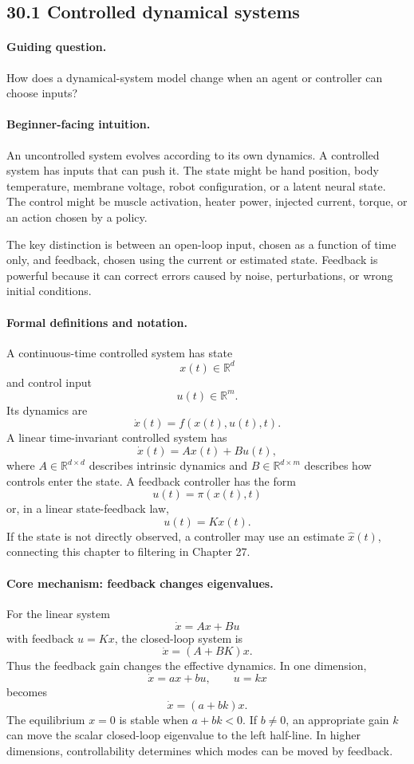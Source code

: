 \subsection{30.1 Controlled dynamical systems}

\paragraph{Guiding question.}
How does a dynamical-system model change when an agent or controller can choose inputs?

\paragraph{Beginner-facing intuition.}
An uncontrolled system evolves according to its own dynamics. A controlled system has inputs that can push it. The state might be hand position, body temperature, membrane voltage, robot configuration, or a latent neural state. The control might be muscle activation, heater power, injected current, torque, or an action chosen by a policy.

The key distinction is between an open-loop input, chosen as a function of time only, and feedback, chosen using the current or estimated state. Feedback is powerful because it can correct errors caused by noise, perturbations, or wrong initial conditions.

\paragraph{Formal definitions and notation.}
A continuous-time controlled system has state
\[
x(t)\in\mathbb R^d
\]
and control input
\[
u(t)\in\mathbb R^m.
\]
Its dynamics are
\[
\boxed{\dot x(t)=f(x(t),u(t),t).}
\]
A linear time-invariant controlled system has
\[
\boxed{\dot x(t)=Ax(t)+Bu(t),}
\]
where \(A\in\mathbb R^{d\times d}\) describes intrinsic dynamics and \(B\in\mathbb R^{d\times m}\) describes how controls enter the state. A feedback controller has the form
\[
u(t)=\pi(x(t),t)
\]
or, in a linear state-feedback law,
\[
u(t)=Kx(t).
\]
If the state is not directly observed, a controller may use an estimate \(\widehat x(t)\), connecting this chapter to filtering in Chapter 27.

\paragraph{Core mechanism: feedback changes eigenvalues.}
For the linear system
\[
\dot x=Ax+Bu
\]
with feedback \(u=Kx\), the closed-loop system is
\[
\dot x=(A+BK)x.
\]
Thus the feedback gain changes the effective dynamics. In one dimension,
\[
\dot x=ax+bu,\qquad u=kx
\]
becomes
\[
\dot x=(a+bk)x.
\]
The equilibrium \(x=0\) is stable when \(a+bk<0\). If \(b\neq0\), an appropriate gain \(k\) can move the scalar closed-loop eigenvalue to the left half-line. In higher dimensions, controllability determines which modes can be moved by feedback.

